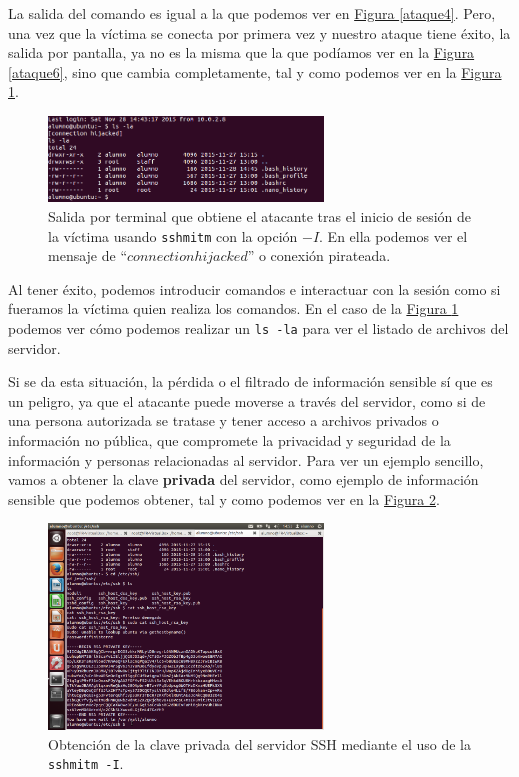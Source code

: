 \documentclass[10pt,a4paper,spanish]{article}
\begin{document}
La salida del comando es igual a la que podemos ver en \hyperref[ataque4]{Figura \ref*{ataque4}}. Pero, una vez que la víctima se conecta por primera vez y nuestro ataque tiene éxito, la salida por pantalla, ya no es la misma que la que podíamos ver en la \hyperref[ataque6]{Figura \ref*{ataque6}}, sino que cambia completamente, tal y como podemos ver en la \hyperref[ataque7]{Figura \ref*{ataque7}}.

\begin{figure}[!h]
        \centering
        \includegraphics[width=0.65\textwidth]{ataque7}
        \caption{Salida por terminal que obtiene el atacante tras el inicio de sesión de la víctima usando \texttt{sshmitm} con la opción $-I$. En ella podemos ver el mensaje de ``$connection hijacked$'' o conexión pirateada.}
        \label{ataque7}
\end{figure}

Al tener éxito, podemos introducir comandos e interactuar con la sesión como si fueramos la víctima quien realiza los comandos. En el caso de la \hyperref[ataque7]{Figura \ref*{ataque7}} podemos ver cómo podemos realizar un \texttt{ls -la} para ver el listado de archivos del servidor.

Si se da esta situación, la pérdida o el filtrado de información sensible sí que es un peligro, ya que el atacante puede moverse a través del servidor, como si de una persona autorizada se tratase y tener acceso a archivos privados o información no pública, que compromete la privacidad y seguridad de la información y personas relacionadas al servidor. Para ver un ejemplo sencillo, vamos a obtener la clave \textbf{privada} del servidor, como ejemplo de información sensible que podemos obtener, tal y como podemos ver en la \hyperref[ataque8]{Figura \ref*{ataque8}}.

\begin{figure}[H]
        \centering
        \includegraphics[width=0.65\textwidth]{ataque8}
        \caption{Obtención de la clave privada del servidor SSH mediante el uso de la \texttt{sshmitm -I}.}
        \label{ataque8}
\end{figure}
\end{document}
